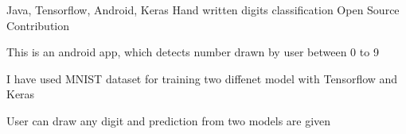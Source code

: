 \begin{cventries}
  \cventry
    {Java, Tensorflow, Android, Keras} %
    {Hand written digits classification} %
    {Open Source Contribution} %
    {} %
    {
      \begin{cvitems} %
        \item {This is an android app, which detects number drawn by user between 0 to 9}
        \item {I have used MNIST dataset for training two diffenet model with Tensorflow and Keras }
        \item {User can draw any digit and prediction from two models are given}
      \end{cvitems}
    }




\end{cventries}
